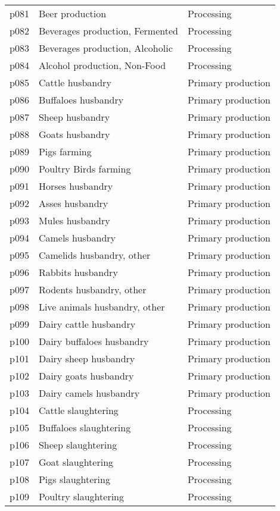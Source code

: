 \documentclass[]{article}
\begin{document}
\begin{longtable}[t]{lll}
\addlinespace
p081 & Beer production & Processing\\
p082 & Beverages production, Fermented & Processing\\
p083 & Beverages production, Alcoholic & Processing\\
p084 & Alcohol production, Non-Food & Processing\\
p085 & Cattle husbandry & Primary production\\
\addlinespace
p086 & Buffaloes husbandry & Primary production\\
p087 & Sheep husbandry & Primary production\\
p088 & Goats husbandry & Primary production\\
p089 & Pigs farming & Primary production\\
p090 & Poultry Birds farming & Primary production\\
\addlinespace
p091 & Horses husbandry & Primary production\\
p092 & Asses husbandry & Primary production\\
p093 & Mules husbandry & Primary production\\
p094 & Camels husbandry & Primary production\\
p095 & Camelids husbandry, other & Primary production\\
\addlinespace
p096 & Rabbits husbandry & Primary production\\
p097 & Rodents husbandry, other & Primary production\\
p098 & Live animals husbandry, other & Primary production\\
p099 & Dairy cattle husbandry & Primary production\\
p100 & Dairy buffaloes husbandry & Primary production\\
\addlinespace
p101 & Dairy sheep husbandry & Primary production\\
p102 & Dairy goats husbandry & Primary production\\
p103 & Dairy camels husbandry & Primary production\\
p104 & Cattle slaughtering & Processing\\
p105 & Buffaloes slaughtering & Processing\\
\addlinespace
p106 & Sheep slaughtering & Processing\\
p107 & Goat slaughtering & Processing\\
p108 & Pigs slaughtering & Processing\\
p109 & Poultry slaughtering & Processing\\

\end{longtable}
\end{document}
